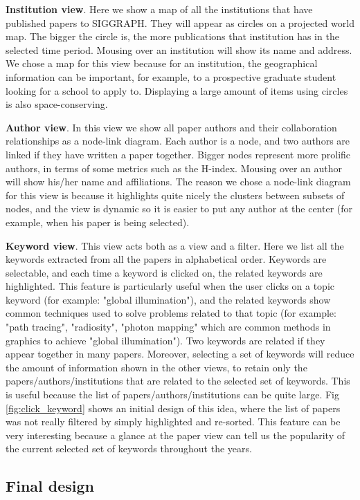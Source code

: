 \textbf{Institution view}. Here we show a map of all the institutions that have published papers to SIGGRAPH. They will appear as circles on a projected world map. The bigger the circle is, the more publications that institution has in the selected time period. Mousing over an institution will show its name and address. We chose a map for this view because for an institution, the geographical information can be important, for example, to a prospective graduate student looking for a school to apply to. Displaying a large amount of items using circles is also space-conserving.

\textbf{Author view}. In this view we show all paper authors and their collaboration relationships as a node-link diagram. Each author is a node, and two authors are linked if they have written a paper together. Bigger nodes represent more prolific authors, in terms of some metrics such as the H-index. Mousing over an author will show his/her name and affiliations. The reason we chose a node-link diagram for this view is because it highlights quite nicely the clusters between subsets of nodes, and the view is dynamic so it is easier to put any author at the center (for example, when his paper is being selected).

\textbf{Keyword view}. This view acts both as a view and a filter. Here we list all the keywords extracted from all the papers in alphabetical order. Keywords are selectable, and each time a keyword is clicked on, the related keywords are highlighted. This feature is particularly useful when the user clicks on a topic keyword (for example: "global illumination"), and the related keywords show common techniques used to solve problems related to that topic (for example: "path tracing", "radiosity", "photon mapping" which are common methods in graphics to achieve "global illumination"). Two keywords are related if they appear together in many papers. Moreover, selecting a set of keywords will reduce the amount of information shown in the other views, to retain only the papers/authors/institutions that are related to the selected set of keywords. This is useful because the list of papers/authors/institutions can be quite large. Fig \ref{fig:click_keyword} shows an initial design of this idea, where the list of papers was not really filtered by simply highlighted and re-sorted. This feature can be very interesting because a glance at the paper view can tell us the popularity of the current selected set of keywords throughout the years.

\subsection{Final design}

